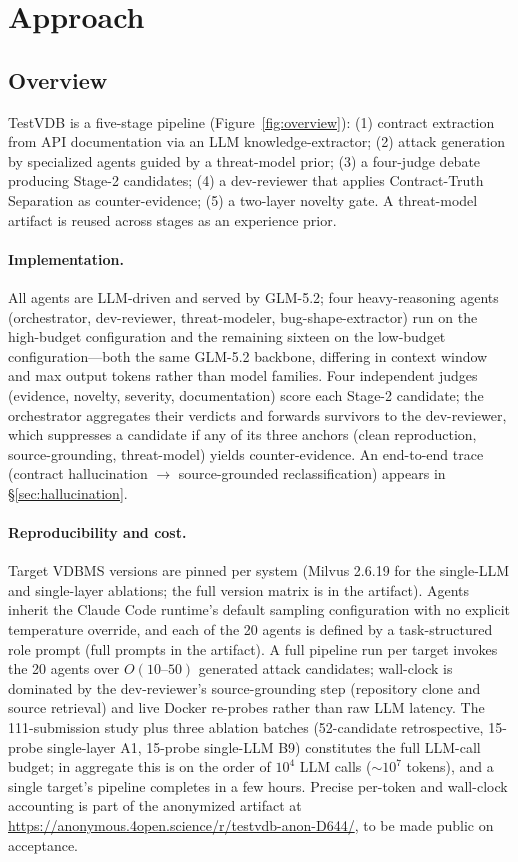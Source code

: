 \documentclass[sigconf]{acmart}
\begin{document}
\section{Approach}\label{sec:approach}

\subsection{Overview}
TestVDB is a five-stage pipeline (Figure~\ref{fig:overview}): (1) contract extraction from API documentation via an LLM knowledge-extractor; (2) attack generation by specialized agents guided by a threat-model prior; (3) a four-judge debate producing Stage-2 candidates; (4) a dev-reviewer that applies Contract-Truth Separation as counter-evidence; (5) a two-layer novelty gate. A threat-model artifact is reused across stages as an experience prior.

\paragraph{Implementation.} All agents are LLM-driven and served by GLM-5.2; four heavy-reasoning agents (orchestrator, dev-reviewer, threat-modeler, bug-shape-extractor) run on the high-budget configuration and the remaining sixteen on the low-budget configuration---both the same GLM-5.2 backbone, differing in context window and max output tokens rather than model families. Four independent judges (evidence, novelty, severity, documentation) score each Stage-2 candidate; the orchestrator aggregates their verdicts and forwards survivors to the dev-reviewer, which suppresses a candidate if any of its three anchors (clean reproduction, source-grounding, threat-model) yields counter-evidence. An end-to-end trace (contract hallucination $\to$ source-grounded reclassification) appears in \S\ref{sec:hallucination}.

\paragraph{Reproducibility and cost.} Target VDBMS versions are pinned per system (Milvus 2.6.19 for the single-LLM and single-layer ablations; the full version matrix is in the artifact). Agents inherit the Claude Code runtime's default sampling configuration with no explicit temperature override, and each of the 20 agents is defined by a task-structured role prompt (full prompts in the artifact). A full pipeline run per target invokes the 20 agents over $O(10\text{--}50)$ generated attack candidates; wall-clock is dominated by the dev-reviewer's source-grounding step (repository clone and source retrieval) and live Docker re-probes rather than raw LLM latency. The 111-submission study plus three ablation batches (52-candidate retrospective, 15-probe single-layer A1, 15-probe single-LLM B9) constitutes the full LLM-call budget; in aggregate this is on the order of $10^4$ LLM calls ($\sim$$10^7$ tokens), and a single target's pipeline completes in a few hours. Precise per-token and wall-clock accounting is part of the anonymized artifact at \url{https://anonymous.4open.science/r/testvdb-anon-D644/}, to be made public on acceptance.
\end{document}
